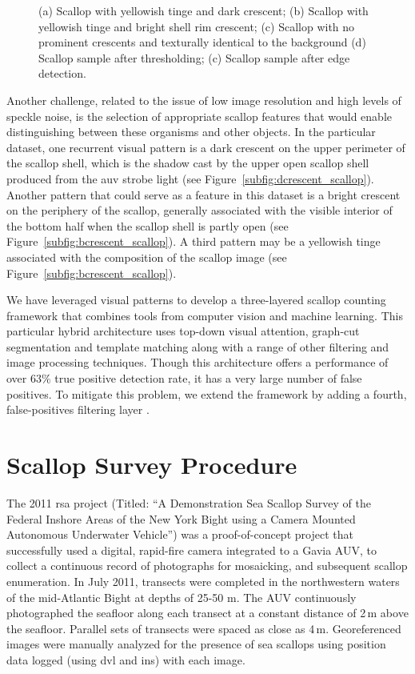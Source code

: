\documentclass {udthesis}
\begin{document}
\begin{figure}
\begin{subfigure}[]{0.17\textwidth}
      \caption{}
      \label{subfig:edge_scallop}
  \end{subfigure}
\caption[Scallop features]{(a) Scallop with yellowish tinge and dark crescent; (b) Scallop with yellowish tinge and bright shell rim crescent; (c) Scallop with no prominent crescents and texturally identical to the background (d) Scallop sample after thresholding; (c) Scallop sample after edge detection.
}
\end{figure}

Another challenge, related to the issue of low image resolution and high levels of speckle noise, is the selection of appropriate scallop features that would enable distinguishing between these organisms and other objects. 
In the particular dataset, one recurrent visual pattern is a dark crescent on the upper perimeter of the scallop shell, which is the shadow cast by the upper open scallop shell produced from the \gls{auv} strobe light (see Figure~\ref{subfig:dcrescent_scallop}). 
Another pattern that could serve as a feature in this dataset is a bright crescent on the periphery of the scallop, generally associated with the visible interior of the bottom half when the scallop shell is partly open (see Figure~\ref{subfig:bcrescent_scallop}).
A third pattern may be a yellowish tinge associated with the composition of the scallop image (see Figure~\ref{subfig:bcrescent_scallop}).

We have leveraged visual patterns \cite{prasanna_aslo} to develop a three-layered scallop counting framework  that combines tools from computer vision and machine learning. 
This particular hybrid architecture uses top-down visual attention, graph-cut segmentation and template matching along with a range of other filtering and image processing techniques. 
Though this architecture offers a performance of over 63\% true positive detection rate, it has a very large number of false positives. 
To mitigate this problem, we extend the framework \cite{prasanna_aslo} by adding a fourth, false-positives filtering layer \cite{prasanna_igi}.

\section{Scallop Survey Procedure}

The 2011 \gls{rsa} 
project (Titled: ``A Demonstration Sea Scallop Survey of the 
Federal Inshore Areas of the New York Bight using a Camera Mounted Autonomous Underwater
 Vehicle'')
was a proof-of-concept project that successfully used a digital, rapid-fire camera integrated 
to a Gavia AUV, to collect a continuous record of photographs for mosaicking, 
and subsequent scallop enumeration. 
In July 2011, transects were completed in the northwestern waters of the mid-Atlantic 
Bight at depths of 25-50 m.  The AUV continuously photographed the 
seafloor along each transect at a constant distance of 2\,m above the seafloor.  
Parallel sets of transects were spaced as close as 4\,m.  
Georeferenced images were manually analyzed for the presence of sea scallops 
using position data logged (using \gls{dvl} and \gls{ins}) with each image.
%
\end{document}
